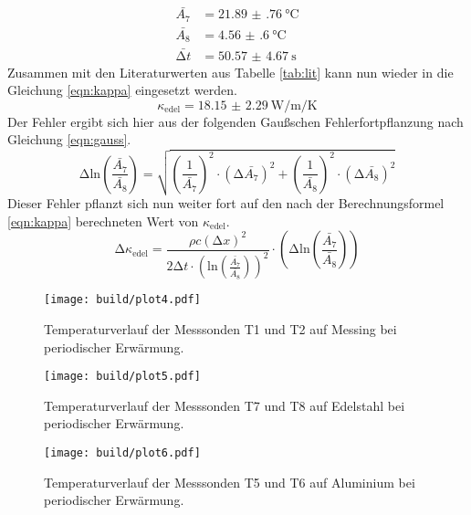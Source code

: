 \begin{align}
    \bar{A_{7}} &= \SI{21.89(76)}{\celsius}      \\
    \bar{A_{8}} &=  \SI{4.56(60)}{\celsius}        \\
    \bar{\increment t} &= \SI{50.57(467)}{\second}
\end{align}
Zusammen mit den Literaturwerten aus Tabelle \ref{tab:lit} kann nun wieder in die Gleichung \eqref{eqn:kappa} eingesetzt werden.
\begin{equation}
    \kappa_{\text{edel}} = \SI{18.15(229)}{\watt\per\meter\per\kelvin}
\end{equation}
Der Fehler ergibt sich hier aus der folgenden Gaußschen Fehlerfortpflanzung nach Gleichung \ref{eqn:gauss}.
\begin{equation}
 \increment \text{ln} \left( \frac{\bar{A_{7}}}{\bar{A_{8}}}\right) = \sqrt{\left( \frac{1}{\bar{A_{7}}} \right)^{2}  \cdot (\increment \bar{A_{7}})^2 + \left( \frac{1}{\bar{A_{8}}}\right)^2 \cdot (\increment \bar{A_{8}})^2}
\end{equation}
Dieser Fehler pflanzt sich nun weiter fort auf den nach der Berechnungsformel \eqref{eqn:kappa} berechneten Wert von $\kappa_{\text{edel}}$.
\begin{equation}
    \increment \kappa_{\text{edel}} = \frac{\rho c \left ( \increment x \right )^2}{2 \increment t \cdot \left(\text{ln} \left( \frac{\bar{A_{7}}}{\bar{A_{8}}}\right)\right)^2} \cdot \left(\increment \text{ln} \left( \frac{\bar{A_{7}}}{\bar{A_{8}}}\right)\right)
\end{equation}

\begin{figure}
    \centering
    \texttt{[image: build/plot4.pdf]}
    \caption{Temperaturverlauf der Messsonden T1 und T2 auf Messing bei periodischer Erwärmung.} 
    \label{fig:plot4}
\end{figure}


\begin{figure}
    \centering
    \texttt{[image: build/plot5.pdf]}
    \caption{Temperaturverlauf der Messsonden T7 und T8 auf Edelstahl bei periodischer Erwärmung.} 
    \label{fig:plot5}
\end{figure}


\begin{figure}
    \centering
    \texttt{[image: build/plot6.pdf]}
    \caption{Temperaturverlauf der Messsonden T5 und T6 auf Aluminium bei periodischer Erwärmung.} 
    \label{fig:plot6}
\end{figure}